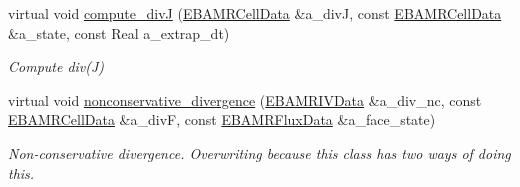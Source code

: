 \begin{DoxyCompactItemize}
virtual void \hyperlink{classcdr__gdnv_aca1629e7ff364a5b822a297878dcd939}{compute\+\_\+divJ} (\hyperlink{type__definitions_8H_a7e610f301989e5e07781c5e338bdb7c3}{E\+B\+A\+M\+R\+Cell\+Data} \&a\+\_\+divJ, const \hyperlink{type__definitions_8H_a7e610f301989e5e07781c5e338bdb7c3}{E\+B\+A\+M\+R\+Cell\+Data} \&a\+\_\+state, const Real a\+\_\+extrap\+\_\+dt)
\begin{DoxyCompactList}\small\item\em Compute div(\+J) \end{DoxyCompactList}\item 
virtual void \hyperlink{classcdr__gdnv_aaf10f7c4c63f52f772e1fcc2c69409c7}{nonconservative\+\_\+divergence} (\hyperlink{type__definitions_8H_a6b8fa905d55cbb491b52180386f0e0c1}{E\+B\+A\+M\+R\+I\+V\+Data} \&a\+\_\+div\+\_\+nc, const \hyperlink{type__definitions_8H_a7e610f301989e5e07781c5e338bdb7c3}{E\+B\+A\+M\+R\+Cell\+Data} \&a\+\_\+divF, const \hyperlink{type__definitions_8H_aadad278b2e5d3d4abcf9032f90ba78c3}{E\+B\+A\+M\+R\+Flux\+Data} \&a\+\_\+face\+\_\+state)
\begin{DoxyCompactList}\small\item\em Non-\/conservative divergence. Overwriting because this class has two ways of doing this. \end{DoxyCompactList}\end{DoxyCompactItemize}
